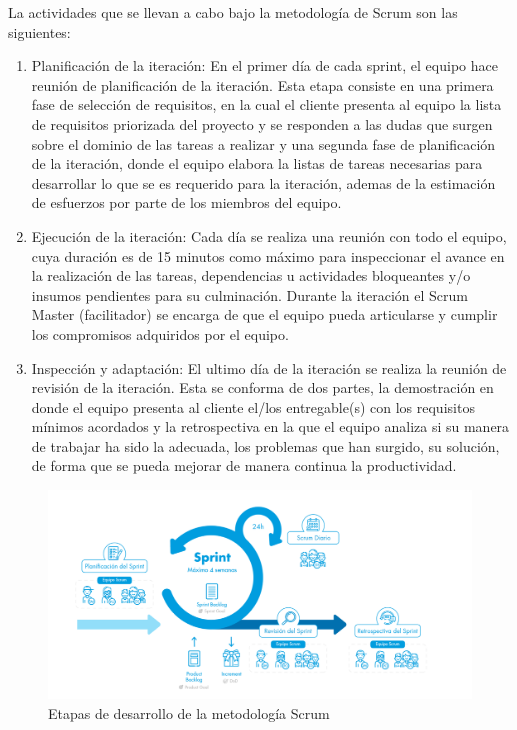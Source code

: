La actividades que se llevan a cabo bajo la metodología de Scrum son las siguientes:

\begin{enumerate}
\item Planificación de la iteración: En el primer día de cada sprint, el equipo hace reunión de planificación de la iteración. Esta etapa consiste en una primera fase de selección de requisitos, en la cual el cliente presenta al equipo la lista de requisitos priorizada del proyecto y se responden a las dudas que surgen sobre el dominio de las tareas a realizar y una segunda fase de planificación de la iteración, donde el equipo elabora la listas de tareas necesarias para desarrollar lo que se es requerido para la iteración, ademas de la estimación de esfuerzos por parte de los miembros del equipo.
\item Ejecución de la iteración: Cada día se realiza una reunión con todo el equipo, cuya duración es de 15 minutos como máximo para inspeccionar el avance en la realización de las tareas, dependencias u actividades bloqueantes y/o insumos pendientes para su culminación. Durante la iteración el Scrum Master (facilitador) se encarga de que el equipo pueda articularse y cumplir los compromisos adquiridos por el equipo.
\item Inspección y adaptación: El ultimo día de la iteración se realiza la reunión de revisión de la iteración. Esta se conforma de dos partes, la demostración en donde el equipo presenta al cliente el/los entregable(s) con los requisitos mínimos acordados y la retrospectiva en la que el equipo analiza si su manera de trabajar ha sido la adecuada, los problemas que han surgido, su solución, de forma que se pueda mejorar de manera continua la productividad.
\end{enumerate}

\begin{figure}[ht]
\centering
\includegraphics[width=1\textwidth]{Figuras/scrum_process.png}
\caption{\label{fig:scrum-process}Etapas de desarrollo de la metodología Scrum}
\vspace*{-10pt}
\end{figure}

